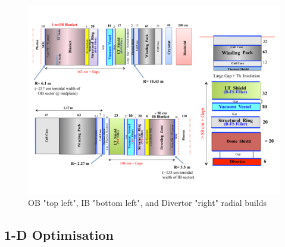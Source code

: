 \documentclass[12pt, letterpaper]{elsarticle}
\begin{document}
\begin{figure}[h!]
  \centering
  \includegraphics[scale=0.4]{../plots/radial_build.png}
  \caption{OB "top left", IB "bottom left", and Divertor "right" radial builds}
  \label{fig:radial build}
\end{figure}
\subsection{1-D Optimisation}
\label{Optimisation}
\end{document}
